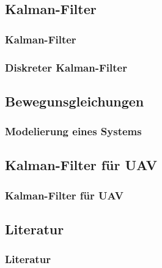 \documentclass[10pt,a4paper,oneside]{beamer}
\begin{document}

\begin{frame}
  \section{Kalman-Filter}
  \frametitle{Kalman-Filter}
\end{frame}

\begin{frame}
  \frametitle{Diskreter Kalman-Filter}
  
\end{frame}

\begin{frame}
  \section{Bewegunsgleichungen}
  \frametitle{Modelierung eines Systems}
\end{frame}

\begin{frame}
  \section{Kalman-Filter für UAV}
  \frametitle{Kalman-Filter für UAV}
\end{frame}

\begin{frame}
  \section{Literatur}
  \frametitle{Literatur}
\printbibliography

\end{frame}
\end{document}
